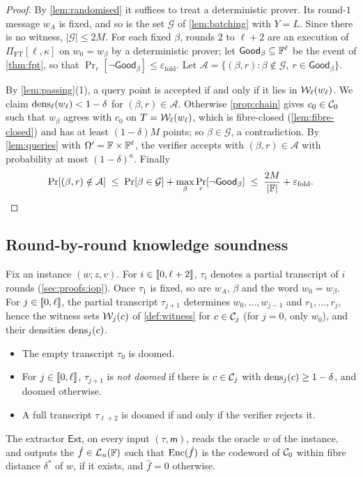 \begin{proof}
By \cref{lem:randomised} it suffices to treat a deterministic prover. Its round-$1$ message $w_A$ is fixed, and so is the set $\mathcal{G}$ of \cref{lem:batching} with $Y = L$. Since there is no witness, $|\mathcal{G}| \le 2M$.
For each fixed $\beta$, rounds $2$ to $\ell+2$ are an execution of $\Pi_{\mathrm{FT}}[\ell,\kappa]$ on $w_0 = w_\beta$ by a deterministic prover; let $\mathsf{Good}_\beta \subseteq \mathbb{F}^\ell$ be the event of \cref{thm:fpt}, so that $\Pr_r[\neg\mathsf{Good}_\beta] \le \varepsilon_{\mathrm{fold}}$.
Let $\mathcal{A} = \{(\beta, r) : \beta \notin \mathcal{G},\ r \in \mathsf{Good}_\beta\}$.

By \cref{lem:passing}(1), a query point is accepted if and only if it lies in $\mathcal{W}_\ell(w_\ell)$.
We claim $\mathrm{dens}_\ell(w_\ell) < 1-\delta$ for $(\beta,r) \in \mathcal{A}$. Otherwise \cref{prop:chain} gives $c_0 \in \mathcal{C}_0$ such that $w_\beta$ agrees with $c_0$ on $T = \mathcal{W}_\ell(w_\ell)$, which is fibre-closed (\cref{lem:fibre-closed}) and has at least $(1-\delta)M$ points; so $\beta \in \mathcal{G}$, a contradiction.
By \cref{lem:queries} with $\Omega' = \mathbb{F} \times \mathbb{F}^\ell$, the verifier accepts with $(\beta,r) \in \mathcal{A}$ with probability at most $(1-\delta)^\kappa$. Finally
\[
  \Pr[(\beta,r) \notin \mathcal{A}] \;\le\; \Pr[\beta \in \mathcal{G}] + \max_\beta \Pr_r[\neg\mathsf{Good}_\beta] \;\le\; \frac{2M}{|\mathbb{F}|} + \varepsilon_{\mathrm{fold}}. \qedhere
\]
\end{proof}

\subsection{Round-by-round knowledge soundness}\label{sec:sound:rbr}

Fix an instance $(w;z,v)$. For $i \in \llbracket 0, \ell+2 \rrbracket$, $\tau_i$ denotes a partial transcript of $i$ rounds (\cref{sec:proofs:iop}).
Once $\tau_1$ is fixed, so are $w_A$, $\beta$ and the word $w_0 = w_\beta$.
For $j \in \llbracket 0, \ell \rrbracket$, the partial transcript $\tau_{j+1}$ determines $w_0,\dots,w_{j-1}$ and $r_1,\dots,r_j$, hence the witness sets $\mathcal{W}_j(c)$ of \cref{def:witness} for $c \in \mathcal{C}_j$ (for $j = 0$, only $w_0$), and their densities $\mathrm{dens}_j(c)$.

\begin{definition}\label{def:doomed}
\begin{itemize}
  \item The empty transcript $\tau_0$ is doomed.
  \item For $j \in \llbracket 0, \ell \rrbracket$, $\tau_{j+1}$ is \emph{not doomed} if there is $c \in \mathcal{C}_j$ with $\mathrm{dens}_j(c) \ge 1-\delta$, and doomed otherwise.
  \item A full transcript $\tau_{\ell+2}$ is doomed if and only if the verifier rejects it.
\end{itemize}
The extractor $\mathsf{Ext}$, on every input $(\tau, \mathsf{m})$, reads the oracle $w$ of the instance, and outputs the $\hat f \in \mathcal{L}_n(\mathbb{F})$ such that $\mathrm{Enc}(\hat f)$ is the codeword of $\mathcal{C}_0$ within fibre distance $\delta^*$ of $w$, if it exists, and $\hat f = 0$ otherwise.
\end{definition}

